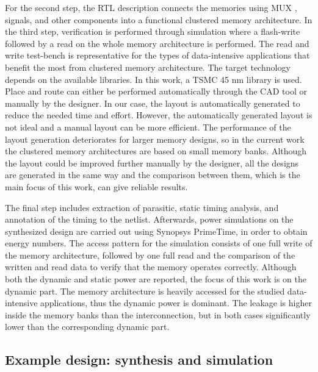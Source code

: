 For the second step, the RTL description connects the memories using MUX , signals, and other components into a functional clustered memory architecture. 
In the third step, verification is performed through simulation where a flash-write followed by a read on the whole memory architecture is performed. 
The read and write test-bench is representative for the types of data-intensive applications that benefit the most from clustered memory architecture. 
The target technology depends on the available libraries.
In this work, a TSMC  45 nm library is used.
Place and route can either be performed automatically through the CAD tool or manually by the designer.
In our case, the layout is automatically generated to reduce the needed time and effort. 
However, the automatically generated layout is not ideal and a manual layout can be more efficient.
The performance of the layout generation deteriorates for larger memory designs, so in the current work the clustered memory architectures are based on small memory banks.
Although the layout could be improved further manually by the designer, all the designs are generated in the same way and the comparison between them, which is the main focus of this work, can give reliable results.


The final step includes extraction of  parasitic, static timing analysis, and annotation of the timing to the netlist.
Afterwards, power simulations on the synthesized design are carried out using Synopsys PrimeTime, in order to obtain energy numbers.
The access pattern for the simulation consists of one full write of the memory architecture, followed by one full read and the comparison of the written and read data to verify that the memory operates correctly.
Although both the dynamic and static power are reported, the focus of this work is on the dynamic part.
The memory architecture is heavily accessed for the studied data-intensive applications, thus the dynamic power is dominant.
The leakage is higher inside the memory banks than the interconnection, but in both cases significantly lower than the corresponding dynamic part.

\subsection{Example design: synthesis and simulation}

